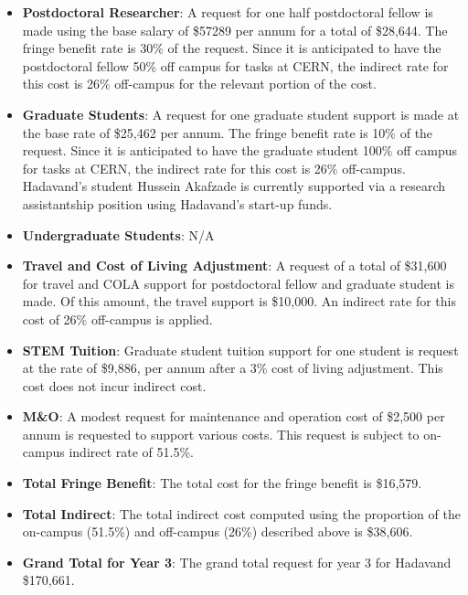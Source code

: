 \begin{enumerate}
\begin{itemize}
\item {{\bf Postdoctoral Researcher}:  A request for one half postdoctoral fellow is made using the base salary of \$57289 per annum for a total of \$28,644.  The fringe benefit rate is 30\% of the request.  Since it is anticipated to have the postdoctoral fellow 50\% off campus for tasks at CERN, the indirect rate for this cost is 26\% off-campus for the relevant portion of the cost.} 

\item{{\bf Graduate Students}:  A request for one graduate student support is made at the base rate of \$25,462 per annum.   The fringe benefit rate is 10\% of the request.  Since it is anticipated to have the graduate student 100\% off campus for tasks at CERN, the indirect rate for this cost is 26\% off-campus.  Hadavand's student Hussein Akafzade is currently supported via a research assistantship position using Hadavand's start-up funds.}

\item {{\bf Undergraduate Students}: N/A}

\item{{\bf Travel and Cost of Living Adjustment}: A request of a total of \$31,600 for travel and COLA support for postdoctoral fellow and graduate student is made. Of this amount, the travel support is \$10,000.  An indirect rate for this cost of 26\% off-campus is applied. }

\item {{\bf STEM Tuition}: Graduate student tuition support for one student is request at the rate of \$9,886, per annum after a 3\% cost of living adjustment.  This cost does not incur indirect cost.}

\item {{\bf M\&O}: A modest request for maintenance and operation cost of \$2,500 per annum is requested to support various costs.   This request is subject to on-campus indirect rate of 51.5\%.}

\item {{\bf Total Fringe Benefit}: The total cost for the fringe benefit is \$16,579.}

\item {{\bf Total Indirect}: The total indirect cost computed using the proportion of the on-campus (51.5\%) and off-campus (26\%) described above is \$38,606.}

\item {{\bf Grand Total for Year 3}: The grand total request for year 3 for Hadavand \$170,661.}

\end{itemize}
\end{enumerate}

\newpage
